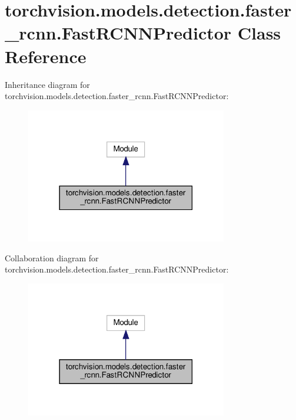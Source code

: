 \hypertarget{classtorchvision_1_1models_1_1detection_1_1faster__rcnn_1_1FastRCNNPredictor}{}\section{torchvision.\+models.\+detection.\+faster\+\_\+rcnn.\+Fast\+R\+C\+N\+N\+Predictor Class Reference}
\label{classtorchvision_1_1models_1_1detection_1_1faster__rcnn_1_1FastRCNNPredictor}


Inheritance diagram for torchvision.\+models.\+detection.\+faster\+\_\+rcnn.\+Fast\+R\+C\+N\+N\+Predictor\+:
\nopagebreak
\begin{figure}[H]
\begin{center}
\leavevmode
\includegraphics[width=249pt]{classtorchvision_1_1models_1_1detection_1_1faster__rcnn_1_1FastRCNNPredictor__inherit__graph}
\end{center}
\end{figure}


Collaboration diagram for torchvision.\+models.\+detection.\+faster\+\_\+rcnn.\+Fast\+R\+C\+N\+N\+Predictor\+:
\nopagebreak
\begin{figure}[H]
\begin{center}
\leavevmode
\includegraphics[width=249pt]{classtorchvision_1_1models_1_1detection_1_1faster__rcnn_1_1FastRCNNPredictor__coll__graph}
\end{center}
\end{figure}
